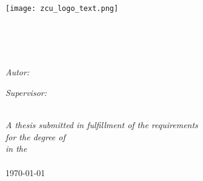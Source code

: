 \frontmatter %

\pagestyle{plain} %


\begin{titlepage}
\begin{center}
\texttt{[image: zcu\_logo\_text.png]} %
\\\vspace{3cm}
\textsc{\Large \ttype}\\[0.2cm] 	 %

\HRule \\[0.4cm] %
{\huge \bfseries \ttitle\par}\vspace{0.4cm} %
\HRule \\[1.5cm] %
 
\begin{minipage}[t]{0.45\textwidth}
\begin{flushleft} \large
\emph{Autor:}\\
{\authorname}
\end{flushleft}
\end{minipage}
\begin{minipage}[t]{0.45\textwidth}
\begin{flushright} \large
\emph{Supervisor:} \\
{\supname}
\end{flushright}
\end{minipage}\\[2.5cm]
 
\large \textit{A thesis submitted in fulfillment of the requirements\\ for the degree of \degreename}\\[0.3cm] %
\textit{in the}\\[0.4cm]
\deptname %
 \\\vspace{2cm}
{\large \today} %
 
\vfill
\end{center}
\end{titlepage}